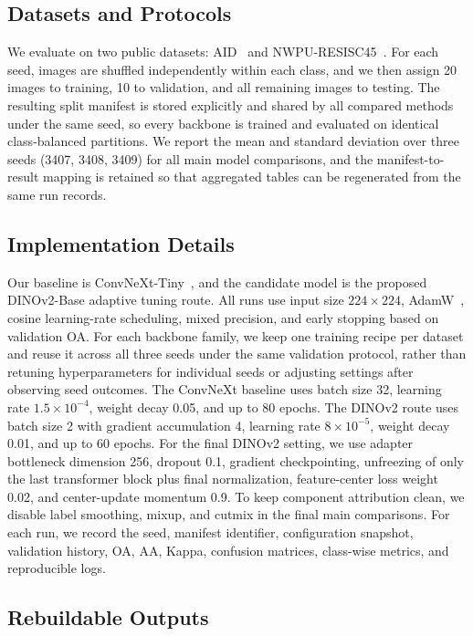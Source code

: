 \documentclass[a4paper,fleqn]{cas-sc}
\begin{document}
\subsection{Datasets and Protocols}

We evaluate on two public datasets: AID~\cite{xia2017aid} and NWPU-RESISC45~\cite{cheng2017nwpu}. For each seed, images are shuffled independently within each class, and we then assign 20 images to training, 10 to validation, and all remaining images to testing. The resulting split manifest is stored explicitly and shared by all compared methods under the same seed, so every backbone is trained and evaluated on identical class-balanced partitions. We report the mean and standard deviation over three seeds (3407, 3408, 3409) for all main model comparisons, and the manifest-to-result mapping is retained so that aggregated tables can be regenerated from the same run records.

\subsection{Implementation Details}

Our baseline is ConvNeXt-Tiny~\cite{liu2022convnext}, and the candidate model is the proposed DINOv2-Base adaptive tuning route. All runs use input size $224 \times 224$, AdamW~\cite{loshchilov2019adamw}, cosine learning-rate scheduling, mixed precision, and early stopping based on validation OA. For each backbone family, we keep one training recipe per dataset and reuse it across all three seeds under the same validation protocol, rather than retuning hyperparameters for individual seeds or adjusting settings after observing seed outcomes. The ConvNeXt baseline uses batch size 32, learning rate $1.5\times 10^{-4}$, weight decay 0.05, and up to 80 epochs. The DINOv2 route uses batch size 2 with gradient accumulation 4, learning rate $8\times 10^{-5}$, weight decay 0.01, and up to 60 epochs. For the final DINOv2 setting, we use adapter bottleneck dimension 256, dropout 0.1, gradient checkpointing, unfreezing of only the last transformer block plus final normalization, feature-center loss weight 0.02, and center-update momentum 0.9. To keep component attribution clean, we disable label smoothing, mixup, and cutmix in the final main comparisons. For each run, we record the seed, manifest identifier, configuration snapshot, validation history, OA, AA, Kappa, confusion matrices, class-wise metrics, and reproducible logs.

\subsection{Rebuildable Outputs}
\end{document}
